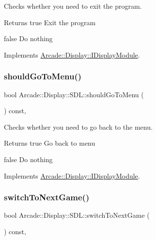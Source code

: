 Checks whether you need to exit the program. 

\begin{DoxyReturn}{Returns}
true Exit the program 

false Do nothing 
\end{DoxyReturn}


Implements \mbox{\hyperlink{classArcade_1_1Display_1_1IDisplayModule_a550877fb92d58325404b9ebe9e71f6ff}{Arcade\+::\+Display\+::\+I\+Display\+Module}}.

\mbox{\label{classArcade_1_1Display_1_1SDL_a044e009d7fc03813fce09abed3a6694c}} 
\subsubsection{\texorpdfstring{shouldGoToMenu()}{shouldGoToMenu()}}
{\footnotesize\ttfamily bool Arcade\+::\+Display\+::\+S\+D\+L\+::should\+Go\+To\+Menu (\begin{DoxyParamCaption}{ }\end{DoxyParamCaption}) const\hspace{0.3cm}{\ttfamily [final]}, {\ttfamily [virtual]}}



Checks whether you need to go back to the menu. 

\begin{DoxyReturn}{Returns}
true Go back to menu 

false Do nothing 
\end{DoxyReturn}


Implements \mbox{\hyperlink{classArcade_1_1Display_1_1IDisplayModule_ad060f6b99f2adffaf02a4226fc40d0ab}{Arcade\+::\+Display\+::\+I\+Display\+Module}}.

\mbox{\label{classArcade_1_1Display_1_1SDL_a3f197b6ea176410b4eb472d7e848eb10}} 
\subsubsection{\texorpdfstring{switchToNextGame()}{switchToNextGame()}}
{\footnotesize\ttfamily bool Arcade\+::\+Display\+::\+S\+D\+L\+::switch\+To\+Next\+Game (\begin{DoxyParamCaption}{ }\end{DoxyParamCaption}) const\hspace{0.3cm}{\ttfamily [final]}, {\ttfamily [virtual]}}




